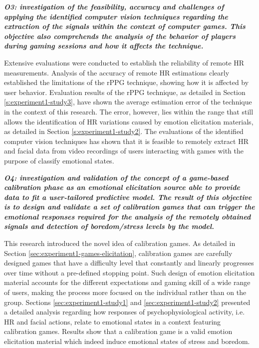 \textit{\textbf{O3: investigation of the feasibility, accuracy and challenges of applying the identified computer vision techniques regarding the extraction of the signals within the context of computer games. This objective also comprehends the analysis of the behavior of players during gaming sessions and how it affects the technique.}}

Extensive evaluations were conducted to establish the reliability of remote HR measurements. Analysis of the accuracy of remote HR estimations clearly established the limitations of the rPPG technique, showing how it is affected by user behavior. Evaluation results of the rPPG technique, as detailed in Section \ref{s:experiment1-study3}, have shown the average estimation error of the technique in the context of this research. The error, however, lies within the range that still allows the identification of HR variations caused by emotion elicitation materials, as detailed in Section \ref{s:experiment1-study2}. The evaluations of the identified computer vision techniques has shown that it is feasible to remotely extract HR and facial data from video recordings of users interacting with games with the purpose of classify emotional states.


\textit{\textbf{O4: investigation and validation of the concept of a game-based calibration phase as an emotional elicitation source able to provide data to fit a user-tailored predictive model. The result of this objective is to design and validate a set of calibration games that can trigger the emotional responses required for the analysis of the remotely obtained signals and detection of boredom/stress levels by the model.}}

This research introduced the novel idea of calibration games. As detailed in Section \ref{sec:experiment1-games-elicitation}, calibration games are carefully designed games that have a difficulty level that constantly and linearly progresses over time without a pre-defined stopping point. Such design of emotion elicitation material accounts for the different expectations and gaming skill of a wide range of users, making the process more focused on the individual rather than on the group. Sections \ref{sec:experiment1-study1} and \ref{sec:experiment1-study2} presented a detailed analysis regarding how responses of psychophysiological activity, i.e. HR and facial actions, relate to emotional states in a context featuring calibration games. Results show that a calibration game is a valid emotion elicitation material which indeed induce emotional states of stress and boredom.

